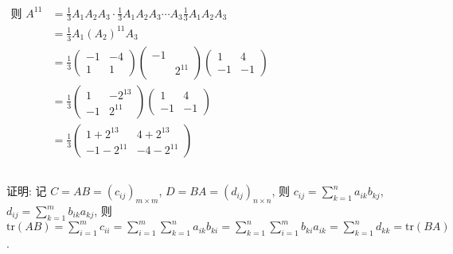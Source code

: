 		 $\begin{aligned}
				 \text{则 }A^{11} & = \frac{1}{3} A_1 A_2 A_3 \cdot \frac{1}{3} A_1 A_2 A_3 \cdots A_3 \frac{1}{3} A_1 A_2 A_3 \\
				                 & = \frac{1}{3} A_1 (A_2)^{11} A_3                                                           \\
				                 & = \frac{1}{3} \begin{pmatrix}
					                                 -1 & -4 \\
					                                 1  & 1
				                                 \end{pmatrix}
				 \begin{pmatrix}
					 -1 &        \\
					    & 2^{11}
				 \end{pmatrix}
				 \begin{pmatrix}
					 1  & 4  \\
					 -1 & -1
				 \end{pmatrix}                                                                                               \\
				                 & = \frac{1}{3} \begin{pmatrix}
					                                 1  & -2^{13} \\
					                                 -1 & 2^{11}
				                                 \end{pmatrix}
				 \begin{pmatrix}
					 1  & 4  \\
					 -1 & -1
				 \end{pmatrix}                                                                                               \\
				                 & = \frac{1}{3} \begin{pmatrix}
					                                 1+2^{13}  & 4+2^{13}  \\
					                                 -1-2^{11} & -4-2^{11}
				                                 \end{pmatrix}
			 \end{aligned}$


 \subsection{} %
	 \paragraph{} %
		 证明: 记 $C = AB = (c_{ij})_{m \times m}$, $D = BA = (d_{ij})_{n \times n}$,
		 则 $c_{ij} = \sum_{k=1}^{n} a_{ik} b_{kj}$, $d_{ij} = \sum_{k=1}^{m} b_{ik} a_{kj}$,
		 则 $\mathrm{tr}(AB) = \sum_{i=1}^{m} c_{ii} = \sum_{i=1}^{m} \sum_{k=1}^{n} a_{ik} b_{ki} = \sum_{k=1}^{n} \sum_{i=1}^{m} b_{ki} a_{ik} = \sum_{k=1}^{n} d_{kk} = \mathrm{tr}(BA)$.


